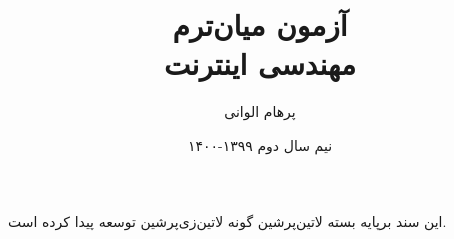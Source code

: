 \documentclass[]{article}
\title{آزمون میان‌ترم‌\\مهندسی اینترنت}
\author{پرهام الوانی}
\date{نیم سال دوم ۱۳۹۹-۱۴۰۰}
\begin{document}
    \maketitle

    
    \vspace*{\fill}
    \begin{center}
این سند برپایه بسته ‌لاتین{‌پرشین} گونه ‌لاتین{‌زی‌پرشین} توسعه پیدا کرده است.
    \end{center}
\end{document}
